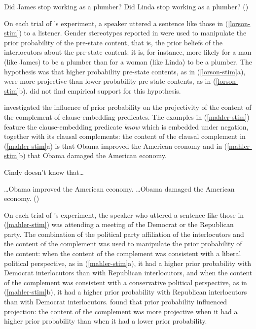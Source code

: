 \documentclass[11pt,fleqn]{article}
\newcommand{\6}{\mbox{$[\hspace*{-.6mm}[$}}
\newcommand{\9}{\mbox{$]\hspace*{-.6mm}]$}}
\newcommand{\citepos}[1]{\citeauthor{#1}'s \citeyear{#1}}
\newcommand{\jt}[1]{\textbf{\color{blue}JT: #1}}
\begin{document}
\begin{exe}
\ex\label{lorson-stim} 
\begin{xlist}
\ex Did James stop working as a plumber?
\ex Did Linda stop working as a plumber? \hfill (\citealt[38]{lorson2018})
\end{xlist}
\end{exe}
On each trial of \citepos{lorson2018} experiment, a speaker uttered a sentence like those in (\ref{lorson-stim}) to a listener. Gender stereotypes reported in \citealt{boyce-etal2018} were used to manipulate the prior probability of the pre-state content, that is, the prior beliefs of the interlocutors about the pre-state content: it is, for instance, more likely for a man (like James) to be a plumber than for a woman (like Linda) to be a plumber. The hypothesis was that higher probability pre-state contents, as in (\ref{lorson-stim}a), were more projective than lower probability pre-state contents, as in (\ref{lorson-stim}b). \citet{lorson2018} did not find empirical support for this hypothesis.

\citet{mahler2020} investigated the influence of prior probability on the projectivity of the content of the complement of clause-embedding predicates. The examples in (\ref{mahler-stim}) feature the clause-embedding predicate {\em know} which is embedded under negation, together with its clausal complements: the content of the clausal complement in (\ref{mahler-stim}a) is that Obama improved the American economy and in (\ref{mahler-stim}b) that Obama damaged the American economy.

\begin{exe}
\ex\label{mahler-stim} Cindy doesn't know that\ldots
\begin{xlist}
\ex \ldots Obama improved the American economy.
\ex \ldots Obama damaged the American economy. \hfill (\citealt[\jt{XX}]{mahler2020})
\end{xlist}
\end{exe}
On each trial of \citepos{mahler2020} experiment, the speaker who uttered a sentence like those in (\ref{mahler-stim}) was attending a meeting of the Democrat or the Republican party. The combination of the political party affiliation of the interlocutors and the content of the complement was used to manipulate the prior probability of the content: when the content of the complement was consistent with a liberal political perspective, as in (\ref{mahler-stim}a), it had a higher prior probability with Democrat interlocutors than with Republican interlocutors, and when the content of the complement was consistent with a conservative political perspective, as in (\ref{mahler-stim}b), it had a higher prior probability with Republican interlocutors than with Democrat interlocutors. \citet{mahler2020} found that prior probability influenced projection: the content of the complement was more projective when it had a higher prior probability than when it had a lower prior probability. 
\end{document}
